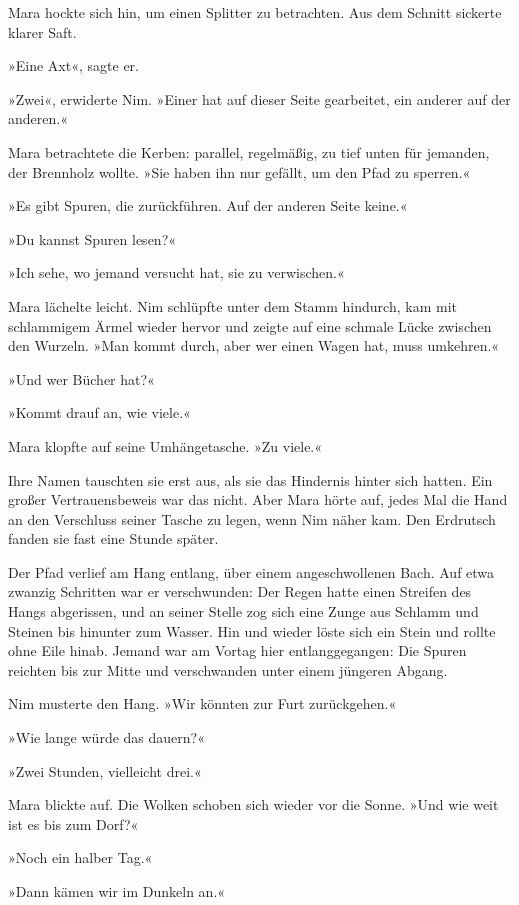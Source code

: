 \documentclass[10pt,a4paper]{article}
\begin{document}
Mara hockte sich hin, um einen Splitter zu betrachten. Aus dem Schnitt sickerte klarer Saft.

»Eine Axt«, sagte er.

»Zwei«, erwiderte Nim. »Einer hat auf dieser Seite gearbeitet, ein anderer auf der anderen.«

Mara betrachtete die Kerben: parallel, regelmäßig, zu tief unten für jemanden, der Brennholz wollte. »Sie haben ihn nur gefällt, um den Pfad zu sperren.«

»Es gibt Spuren, die zurückführen. Auf der anderen Seite keine.«

»Du kannst Spuren lesen?«

»Ich sehe, wo jemand versucht hat, sie zu verwischen.«

Mara lächelte leicht. Nim schlüpfte unter dem Stamm hindurch, kam mit schlammigem Ärmel wieder hervor und zeigte auf eine schmale Lücke zwischen den Wurzeln. »Man kommt durch, aber wer einen Wagen hat, muss umkehren.«

»Und wer Bücher hat?«

»Kommt drauf an, wie viele.«

Mara klopfte auf seine Umhängetasche. »Zu viele.«

Ihre Namen tauschten sie erst aus, als sie das Hindernis hinter sich hatten. Ein großer Vertrauensbeweis war das nicht. Aber Mara hörte auf, jedes Mal die Hand an den Verschluss seiner Tasche zu legen, wenn Nim näher kam.
Den Erdrutsch fanden sie fast eine Stunde später.

Der Pfad verlief am Hang entlang, über einem angeschwollenen Bach. Auf etwa zwanzig Schritten war er verschwunden: Der Regen hatte einen Streifen des Hangs abgerissen, und an seiner Stelle zog sich eine Zunge aus Schlamm und Steinen bis hinunter zum Wasser. Hin und wieder löste sich ein Stein und rollte ohne Eile hinab. Jemand war am Vortag hier entlanggegangen: Die Spuren reichten bis zur Mitte und verschwanden unter einem jüngeren Abgang.

Nim musterte den Hang. »Wir könnten zur Furt zurückgehen.«

»Wie lange würde das dauern?«

»Zwei Stunden, vielleicht drei.«

Mara blickte auf. Die Wolken schoben sich wieder vor die Sonne. »Und wie weit ist es bis zum Dorf?«

»Noch ein halber Tag.«

»Dann kämen wir im Dunkeln an.«
\end{document}
